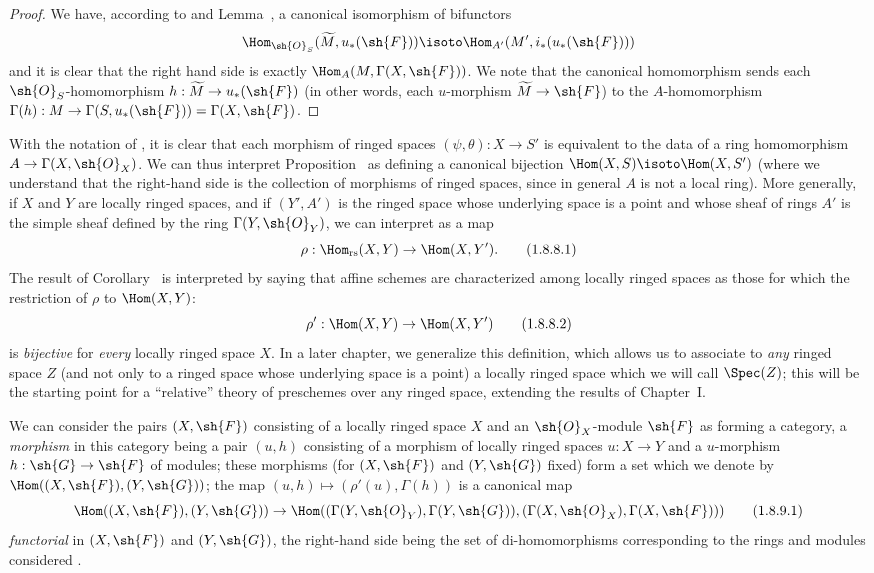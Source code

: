 \begin{proof}
We have, according to  and Lemma~, a canonical
isomorphism of bifunctors
\[
  \Hom_{\sh{O}_S}(\widetilde{M},u_*(\sh{F}))\isoto\Hom_{A'}(M',i_*(u_*(\sh{F})))
\]
and it is clear that the right hand side is exactly $\Hom_A(M,\Gamma(X,\sh{F}))$.
We note that the canonical homomorphism  sends each $\sh{O}_S$-homomorphism $h:\widetilde{M}\to u_*(\sh{F})$ (in other words, each $u$-morphism $\widetilde{M}\to\sh{F}$) to the $A$-homomorphism $\Gamma(h):M\to\Gamma(S,u_*(\sh{F}))=\Gamma(X,\sh{F})$.
\end{proof}

\begin{env}[1.8.8]
\label{I.1.8.8}
With the notation of , it is clear  that each morphism of ringed spaces $(\psi,\theta):X\to S'$ is equivalent to the data of a ring homomorphism $A\to\Gamma(X,\sh{O}_X)$.
We can thus interpret Proposition~ as defining a canonical bijection $\Hom(X,S)\isoto\Hom(X,S')$ (where we understand that the right-hand side is the collection of morphisms of ringed spaces, since in general $A$ is not a local ring).
More generally, if $X$ and $Y$ are locally ringed spaces, and if $(Y',A')$ is the ringed space whose underlying space is a point and whose sheaf of rings $A'$ is the simple sheaf defined by the ring $\Gamma(Y,\sh{O}_Y)$, we can interpret  as a map
\[
  \label{I.1.8.8.1}
  \rho:\Hom_\text{rs}(X,Y)\to\Hom(X,Y').
  \tag{1.8.8.1}
\]
The result of Corollary~ is interpreted by saying that affine schemes are characterized among locally ringed spaces as those for which the restriction of $\rho$ to
$\Hom(X,Y)$:
\[
  \label{I.1.8.8.2}
  \rho':\Hom(X,Y)\to\Hom(X,Y')
  \tag{1.8.8.2}
\]
is \emph{bijective} for \emph{every} locally ringed space $X$.
In a later chapter, we generalize this definition, which allows us to associate to \emph{any} ringed space $Z$ (and not only to a ringed space whose underlying space is a point) a locally ringed space which we will call $\Spec(Z)$;
this will be the starting point for a ``relative'' theory of preschemes over any ringed space, extending the results of Chapter~I.
\end{env}

\begin{env}[1.8.9]
\label{I.1.8.9}
We can consider the pairs $(X,\sh{F})$ consisting of a locally ringed space $X$ and an $\sh{O}_X$-module $\sh{F}$ as forming a category, a \emph{morphism} in this category being a pair $(u,h)$ consisting of a morphism of locally ringed spaces
$u:X\to Y$ and a $u$-morphism $h:\sh{G}\to\sh{F}$ of modules;
these morphisms (for $(X,\sh{F})$ and $(Y,\sh{G})$ fixed) form a set which we denote by $\Hom((X,\sh{F}),(Y,\sh{G}))$;
the map $(u,h)\mapsto(\rho'(u),\Gamma(h))$ is a canonical map
\[
  \label{I.1.8.9.1}
  \Hom((X,\sh{F}),(Y,\sh{G}))\to\Hom((\Gamma(Y,\sh{O}_Y),\Gamma(Y,\sh{G})),(\Gamma(X,\sh{O}_X),\Gamma(X,\sh{F})))
  \tag{1.8.9.1}
\]
\emph{functorial} in $(X,\sh{F})$ and $(Y,\sh{G})$, the right-hand side being the set of di-homomorphisms corresponding to the rings and modules considered .
\end{env}

